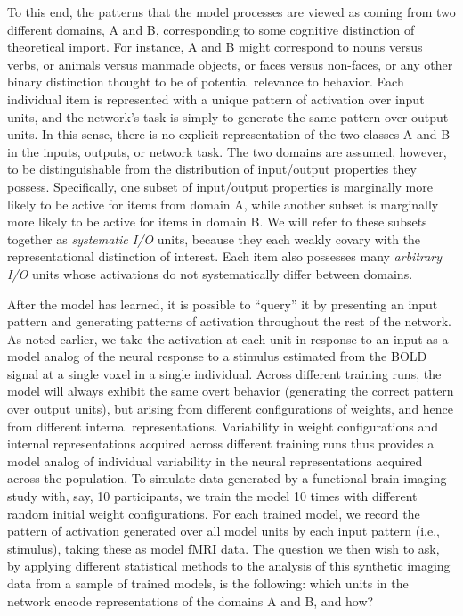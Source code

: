 To this end, the patterns that the model processes are viewed as coming from two different domains, A and B, corresponding to some cognitive distinction of theoretical import. For instance, A and B might correspond to nouns versus verbs, or animals versus manmade objects, or faces versus non-faces, or any other binary distinction thought to be of potential relevance to behavior. Each individual item is represented with a unique pattern of activation over input units, and the network's task is simply to generate the same pattern over output units. In this sense, there is no explicit representation of the two classes A and B in the inputs, outputs, or network task. The two domains are assumed, however, to be distinguishable from the distribution of input/output properties they possess. Specifically, one subset of input/output properties is marginally more likely to be active for items from domain A, while another subset is marginally more likely to be active for items in domain B. We will refer to these subsets together as {\em systematic I/O} units, because they each weakly covary with the representational distinction of interest.  Each item also possesses many {\em arbitrary I/O} units whose activations do not systematically differ between domains.

After the model has learned, it is possible to ``query'' it by presenting an input pattern and generating patterns of activation throughout the rest of the network. As noted earlier, we take the activation at each unit in response to an input as a model analog of the neural response to a stimulus estimated from the BOLD signal at a single voxel in a single individual. Across different training runs, the model will always exhibit the same overt behavior (generating the correct pattern over output units), but arising from different configurations of weights, and hence from different internal representations. Variability in weight configurations and internal representations acquired across different training runs thus provides a model analog of individual variability in the neural representations acquired across the population. To simulate data generated by a functional brain imaging study with, say, 10 participants, we train the model 10 times with different random initial weight configurations. For each trained model, we record the pattern of activation generated over all model units by each input pattern (i.e., stimulus), taking these as model fMRI data.  The question we then wish to ask, by applying different statistical methods to the analysis of this synthetic imaging data from a sample of trained models, is the following: which units in the network encode representations of the domains A and B, and how?

